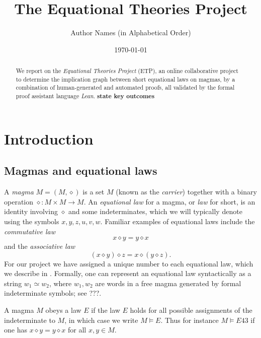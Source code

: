 \documentclass[12pt]{article}
\title{The Equational Theories Project}
\author{Author Names (in Alphabetical Order)}
\date{\today}
\theoremstyle{definition}
\newcommand{\op}{\diamond}
\newcommand{\formaleq}{\simeq}
\begin{document}
\begin{abstract}  We report on the \emph{Equational Theories Project} (ETP), an online collaborative project to determine the implication graph between short equational laws on magmas, by a combination of human-generated and automated proofs, all validated by the formal proof assistant language \emph{Lean}.  {\bf state key outcomes}
\end{abstract}

\maketitle

\tableofcontents

\section{Introduction}

\subsection{Magmas and equational laws}

A \emph{magma} $M = (M,\op)$ is a set $M$ (known as the \emph{carrier}) together with a binary operation $\op \colon M \times M \to M$.  An \emph{equational law} for a magma, or \emph{law} for short, is an identity involving $\op$ and some indeterminates, which we will typically denote using the symbols $x,y,z,u,v,w$.  Familiar examples of equational laws include the \emph{commutative law}
\begin{equation}\label{eq43}\tag{E43}
    x \op y = y \op x
\end{equation}
and the \emph{associative law}
\begin{equation}\label{eq4512}\tag{E4512}
    (x \op y) \op z = x \op (y \op z).
\end{equation}
For our project we have assigned a unique number to each equational law, which we describe in .  Formally, one can represent an equational law syntactically as a string $w_1 \formaleq w_2$, where $w_1, w_2$ are words in a free magma generated by formal indeterminate symbols; see ???.

A magma $M$ obeys a law $E$ if the law $E$ holds for all possible assignments of the indeterminate to $M$, in which case we write $M \models E$.  Thus for instance $M \models E43$ if one has $x \op y = y \op x$ for all $x,y \in M$.
\end{document}
